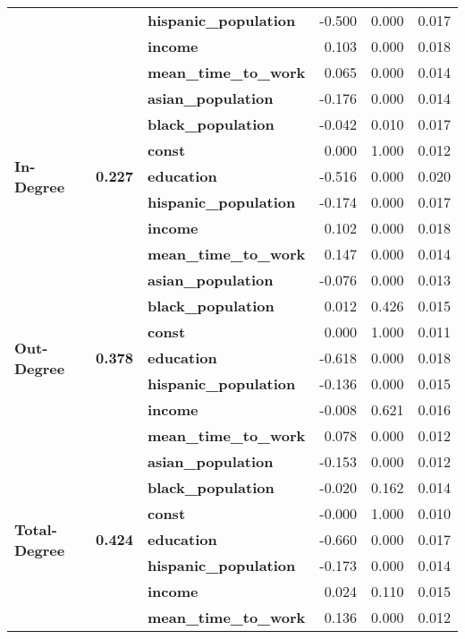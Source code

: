 \begin{tabular}{lllrrr}
             &       & \textbf{hispanic\_population} & -0.500 &    0.000 &    0.017 \\
             &       & \textbf{income} &  0.103 &    0.000 &    0.018 \\
             &       & \textbf{mean\_time\_to\_work} &  0.065 &    0.000 &    0.014 \\
\cline{1-6}
\cline{2-6}
\multirow{7}{*}{\textbf{In-Degree}} & \multirow{7}{*}{\textbf{0.227}} & \textbf{asian\_population} & -0.176 &    0.000 &    0.014 \\
             &       & \textbf{black\_population} & -0.042 &    0.010 &    0.017 \\
             &       & \textbf{const} &  0.000 &    1.000 &    0.012 \\
             &       & \textbf{education} & -0.516 &    0.000 &    0.020 \\
             &       & \textbf{hispanic\_population} & -0.174 &    0.000 &    0.017 \\
             &       & \textbf{income} &  0.102 &    0.000 &    0.018 \\
             &       & \textbf{mean\_time\_to\_work} &  0.147 &    0.000 &    0.014 \\
\cline{1-6}
\cline{2-6}
\multirow{7}{*}{\textbf{Out-Degree}} & \multirow{7}{*}{\textbf{0.378}} & \textbf{asian\_population} & -0.076 &    0.000 &    0.013 \\
             &       & \textbf{black\_population} &  0.012 &    0.426 &    0.015 \\
             &       & \textbf{const} &  0.000 &    1.000 &    0.011 \\
             &       & \textbf{education} & -0.618 &    0.000 &    0.018 \\
             &       & \textbf{hispanic\_population} & -0.136 &    0.000 &    0.015 \\
             &       & \textbf{income} & -0.008 &    0.621 &    0.016 \\
             &       & \textbf{mean\_time\_to\_work} &  0.078 &    0.000 &    0.012 \\
\cline{1-6}
\cline{2-6}
\multirow{7}{*}{\textbf{Total-Degree}} & \multirow{7}{*}{\textbf{0.424}} & \textbf{asian\_population} & -0.153 &    0.000 &    0.012 \\
             &       & \textbf{black\_population} & -0.020 &    0.162 &    0.014 \\
             &       & \textbf{const} & -0.000 &    1.000 &    0.010 \\
             &       & \textbf{education} & -0.660 &    0.000 &    0.017 \\
             &       & \textbf{hispanic\_population} & -0.173 &    0.000 &    0.014 \\
             &       & \textbf{income} &  0.024 &    0.110 &    0.015 \\
             &       & \textbf{mean\_time\_to\_work} &  0.136 &    0.000 &    0.012 \\
\bottomrule
\end{tabular}
